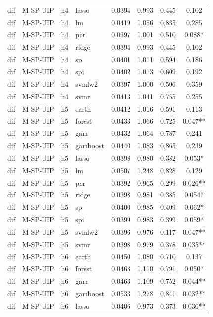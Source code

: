\begin{ThreePartTable}
\begin{longtable}[t]{llclcccc}
dif & M-SP-UIP & h4 & lasso & 0.0394 & 0.993 & 0.445 & 0.102\\
dif & M-SP-UIP & h4 & lm & 0.0419 & 1.056 & 0.835 & 0.285\\
dif & M-SP-UIP & h4 & pcr & 0.0397 & 1.001 & 0.510 & 0.088*\\
dif & M-SP-UIP & h4 & ridge & 0.0394 & 0.993 & 0.445 & 0.102\\
dif & M-SP-UIP & h4 & sp & 0.0401 & 1.011 & 0.594 & 0.186\\
dif & M-SP-UIP & h4 & spi & 0.0402 & 1.013 & 0.609 & 0.192\\
dif & M-SP-UIP & h4 & svmlw2 & 0.0397 & 1.000 & 0.506 & 0.359\\
dif & M-SP-UIP & h4 & svmr & 0.0413 & 1.041 & 0.755 & 0.255\\
\addlinespace
dif & M-SP-UIP & h5 & earth & 0.0412 & 1.016 & 0.591 & 0.113\\
dif & M-SP-UIP & h5 & forest & 0.0433 & 1.066 & 0.725 & 0.047**\\
dif & M-SP-UIP & h5 & gam & 0.0432 & 1.064 & 0.787 & 0.241\\
dif & M-SP-UIP & h5 & gamboost & 0.0440 & 1.083 & 0.865 & 0.239\\
dif & M-SP-UIP & h5 & lasso & 0.0398 & 0.980 & 0.382 & 0.053*\\
dif & M-SP-UIP & h5 & lm & 0.0507 & 1.248 & 0.828 & 0.129\\
dif & M-SP-UIP & h5 & pcr & 0.0392 & 0.965 & 0.299 & 0.026**\\
dif & M-SP-UIP & h5 & ridge & 0.0398 & 0.981 & 0.385 & 0.054*\\
dif & M-SP-UIP & h5 & sp & 0.0400 & 0.985 & 0.409 & 0.062*\\
dif & M-SP-UIP & h5 & spi & 0.0399 & 0.983 & 0.399 & 0.059*\\
dif & M-SP-UIP & h5 & svmlw2 & 0.0396 & 0.976 & 0.117 & 0.047**\\
dif & M-SP-UIP & h5 & svmr & 0.0398 & 0.979 & 0.378 & 0.035**\\
\addlinespace
dif & M-SP-UIP & h6 & earth & 0.0450 & 1.080 & 0.710 & 0.137\\
dif & M-SP-UIP & h6 & forest & 0.0463 & 1.110 & 0.791 & 0.050*\\
dif & M-SP-UIP & h6 & gam & 0.0463 & 1.109 & 0.752 & 0.044**\\
dif & M-SP-UIP & h6 & gamboost & 0.0533 & 1.278 & 0.841 & 0.032**\\
dif & M-SP-UIP & h6 & lasso & 0.0406 & 0.973 & 0.373 & 0.036**\\

\end{longtable}
\end{ThreePartTable}
